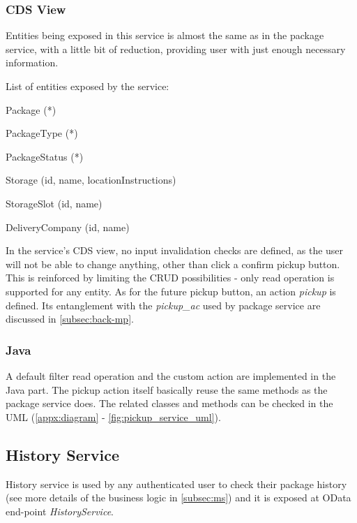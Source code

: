 \subsubsection{CDS View}

Entities being exposed in this service is almost the same as in the package service, with a little bit of reduction, providing user with just enough necessary information. 

\bigskip
\noindent
List of entities exposed by the service:
\begin{compactenum}
	\item Package (*)
    \item PackageType (*)
    \item PackageStatus (*)
    \item Storage (id, name, locationInstructions)
    \item StorageSlot (id, name)
    \item DeliveryCompany (id, name)
\end{compactenum}

\bigskip
In the service's CDS view, no input invalidation checks are defined, as the user will not be able to change anything, other than click a confirm pickup button. This is reinforced by limiting the CRUD possibilities - only read operation is supported for any entity. As for the future pickup button, an action \textit{pickup} is defined. Its entanglement with the \textit{pickup\_ac} used by package service are discussed in \autoref{subsec:back-mp}.


\subsubsection{Java}

A default filter read operation and the custom action are implemented in the Java part. The pickup action itself basically reuse the same methods as the package service does. The related classes and methods can be checked in the UML (\autoref{appx:diagram} - \autoref{fig:pickup_service_uml}). 


\subsection{History Service}
\label{subsec:back-ph}

History service is used by any authenticated user to check their package history (see more details of the business logic in \autoref{subsec:ms}) and it is exposed at OData end-point \textit{HistoryService}.

